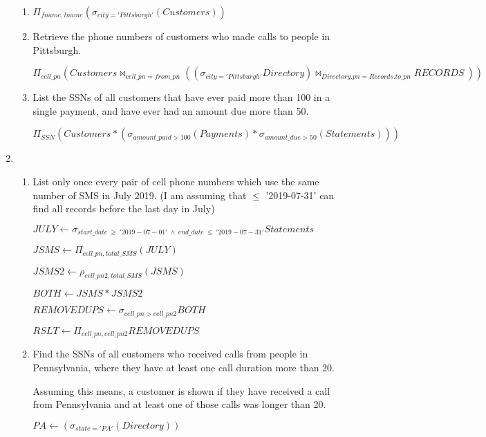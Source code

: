 \documentclass[12pt]{article}
\begin{document}
\begin{enumerate}
\begin{enumerate}
	
\item
$ \Pi_{fname, lname}(\sigma_{city='Pittsburgh'}(Customers)) $

\item
Retrieve the phone numbers of customers who made calls to people in Pittsburgh.

\noindent $ \Pi_{cell\_pn} (Customers \bowtie_{cell\_pn = from\_pn} ((\sigma_{city='Pittsburgh'} Directory) 
\bowtie_{Directory.pn = Records.to\_pn} RECORDS \ )) $

\item
List the SSNs of all customers that have ever paid more than 100 in a single payment,
and have ever had an amount due more than 50.

\noindent $ \Pi_{SSN}(Customers * (\sigma_{amount\_paid > 100}(Payments) 
* \sigma_{amount\_due > 50}(Statements)) ) $

\end{enumerate}

\item

\begin{enumerate}

\item 
List only once every pair of cell phone numbers which use the same number of SMS
in July 2019. (I am assuming that $ \leq $ '2019-07-31' can find all records before the last day
in July)

$ JULY \leftarrow \sigma_{start\_date \ \geq \ '2019-07-01' \ \land \ end\_date \ \leq \ '2019-07-31'} Statements $

$ JSMS \leftarrow \Pi_{cell\_pn, total\_SMS} (JULY) $

$ JSMS2 \leftarrow \rho_{cell\_pn2, total\_SMS} (JSMS) $

$ BOTH \leftarrow JSMS * JSMS2 $

$ REMOVEDUPS \leftarrow \sigma_{cell\_pn > cell\_pn2} BOTH $

$ RSLT \leftarrow \Pi_{cell\_pn, cell\_pn2} REMOVEDUPS $

\item
Find the SSNs of all customers who received calls from people in Pennsylvania, where
they have at least one call duration more than 20.

Assuming this means, a customer is shown if they have received
a call from Pennsylvania and at least one of those calls was 
longer than 20. 


$ PA \leftarrow (\sigma_{state='PA'}(Directory)) $


\end{enumerate}
\end{enumerate}
\end{document}
